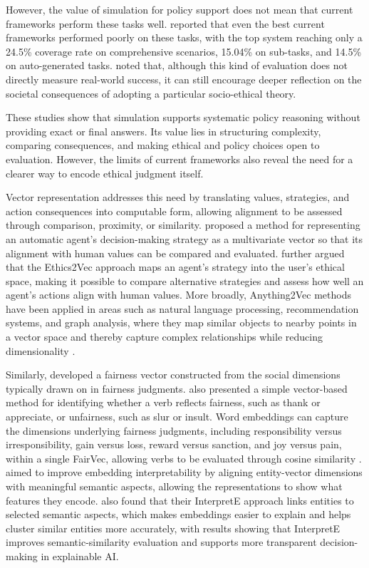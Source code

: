 \documentclass{icsthesis}
\begin{document}
\begin{mainmatter}
However, the value of simulation for policy support does not mean that current frameworks perform these tasks well. \citet{Kang2025} reported that even the best current frameworks performed poorly on these tasks, with the top system reaching only a 24.5\% coverage rate on comprehensive scenarios, 15.04\% on sub-tasks, and 14.5\% on auto-generated tasks. \citet{KremerHerman2024b} noted that, although this kind of evaluation does not directly measure real-world success, it can still encourage deeper reflection on the societal consequences of adopting a particular socio-ethical theory.

These studies show that simulation supports systematic policy reasoning without providing exact or final answers. Its value lies in structuring complexity, comparing consequences, and making ethical and policy choices open to evaluation. However, the limits of current frameworks also reveal the need for a clearer way to encode ethical judgment itself. 

Vector representation addresses this need by translating values, strategies, and action consequences into computable form, allowing alignment to be assessed through comparison, proximity, or similarity. \citet{Bontempi2025} proposed a method for representing an automatic agent’s decision-making strategy as a multivariate vector so that its alignment with human values can be compared and evaluated. \citet{Bontempi2025} further argued that the Ethics2Vec approach maps an agent’s strategy into the user’s ethical space, making it possible to compare alternative strategies and assess how well an agent’s actions align with human values. More broadly, Anything2Vec methods have been applied in areas such as natural language processing, recommendation systems, and graph analysis, where they map similar objects to nearby points in a vector space and thereby capture complex relationships while reducing dimensionality \citep{Bontempi2025}.

Similarly, \citet{Izzidien2022} developed a fairness vector constructed from the social dimensions typically drawn on in fairness judgments. \citet{Izzidien2022} also presented a simple vector-based method for identifying whether a verb reflects fairness, such as thank or appreciate, or unfairness, such as slur or insult. Word embeddings can capture the dimensions underlying fairness judgments, including responsibility versus irresponsibility, gain versus loss, reward versus sanction, and joy versus pain, within a single FairVec, allowing verbs to be evaluated through cosine similarity \citep{Izzidien2022}. \citet{doi:10.1177/29498732251377351} aimed to improve embedding interpretability by aligning entity-vector dimensions with meaningful semantic aspects, allowing the representations to show what features they encode. \citet{doi:10.1177/29498732251377351} also found that their InterpretE approach links entities to selected semantic aspects, which makes embeddings easier to explain and helps cluster similar entities more accurately, with results showing that InterpretE improves semantic-similarity evaluation and supports more transparent decision-making in explainable AI. 


\end{mainmatter}
\end{document}
